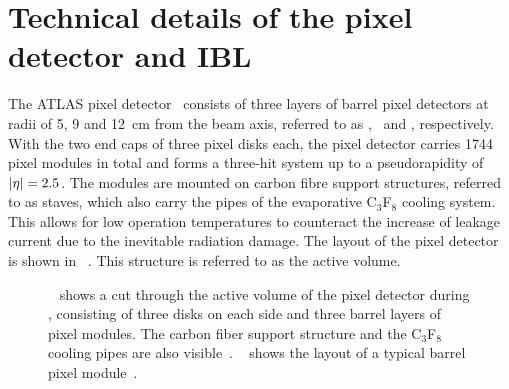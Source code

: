 \section{Technical details of the pixel detector and IBL}
The \gls{ATLAS} pixel detector~\cite{pixeltdr} consists of three layers of barrel pixel detectors at radii of 5, 9 and 12~cm from the beam axis, referred to as \blayer, \layerone\ and \layertwo, respectively. With the two end caps of three pixel disks each, the pixel detector carries 1744 pixel modules in total and forms a three-hit system up to a pseudorapidity of $|\eta|=2.5$. The modules are mounted on carbon fibre support structures, referred to as staves, which also carry the pipes of the evaporative C$_3$F$_8$ cooling system. This allows for low operation temperatures to counteract the increase of leakage current due to the inevitable radiation damage. The layout of the pixel detector is shown in \fig~. This structure is referred to as the active volume.
%
\begin{figure}[tbp!]
\centering
\hfill
\caption[The pixel detector and module layout]{
%
\Fig~ shows a cut through the active volume of the pixel detector during \RunOne, consisting of three disks on each side and three barrel layers of pixel modules. The carbon fiber support structure and the C$_3$F$_8$ cooling pipes are also visible~\cite{ATLASpublic}.
%
\Fig~ shows the layout of a typical barrel pixel module~\cite{atlasexp}. 
%
}
\label{fig:Pixellayout}
\end{figure}
